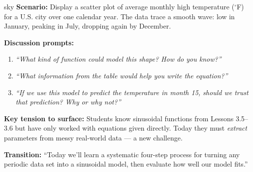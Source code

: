 \documentclass[10pt]{article}
\begin{document}
\vspace{0.08in}

\begin{skillbox}{sky}
\textbf{Scenario:} Display a scatter plot of average monthly high temperature
(${}^\circ$F) for a U.S. city over one calendar year. The data trace a smooth
wave: low in January, peaking in July, dropping again by December.

\textbf{Discussion prompts:}
\begin{enumerate}[leftmargin=1.4em, itemsep=3pt]
  \item \textit{``What kind of function could model this shape? How do you know?''}
  \item \textit{``What information from the table would help you write the equation?''}
  \item \textit{``If we use this model to predict the temperature in month 15,
    should we trust that prediction? Why or why not?''}
\end{enumerate}

\textbf{Key tension to surface:} Students know sinusoidal functions from Lessons
3.5--3.6 but have only worked with equations given directly. Today they must
\emph{extract} parameters from messy real-world data --- a new challenge.

\textbf{Transition:} ``Today we'll learn a systematic four-step process for turning
any periodic data set into a sinusoidal model, then evaluate how well our model fits.''
\end{skillbox}

\vspace{0.08in}
\end{document}

